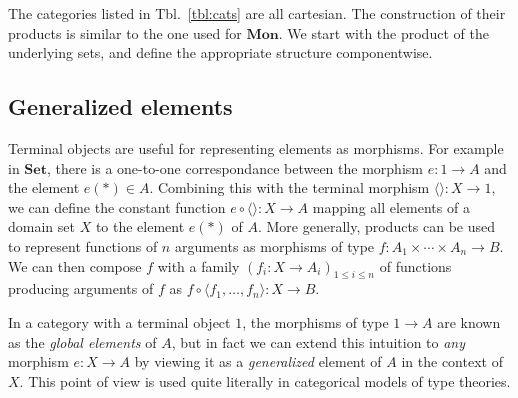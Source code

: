 \documentclass[draft,11pt]{report}
\theoremstyle{definition}
\begin{document}
The categories listed in Tbl.~\ref{tbl:cats} are all cartesian.
The construction of their products is similar to
the one used for $\mathbf{Mon}$.
We start with the product of the underlying sets,
and define the appropriate structure componentwise.


\subsection{Generalized elements} %

Terminal objects are useful for representing elements as morphisms.
For example in $\mathbf{Set}$,
there is a one-to-one correspondance between the morphism
$e : 1 \rightarrow A$ and the element $e(*) \in A$.
Combining this with the terminal morphism $\langle \rangle : X \rightarrow 1$,
we can define the constant function
$e \circ \langle \rangle : X \rightarrow A$
mapping all elements of a domain set $X$
to the element $e(*)$ of $A$.
More generally,
products can be used to represent functions
of $n$ arguments as morphisms of type
$f : A_1 \times \cdots \times A_n \rightarrow B$.
We can then compose $f$ with a family
$(f_i : X \rightarrow A_i)_{1 \le i \le n}$
of functions producing arguments of $f$
as $f \circ \langle f_1, \ldots, f_n \rangle : X \rightarrow B$.

In a category with a terminal object $1$,
the morphisms of type $1 \rightarrow A$ are known as
the \emph{global elements} of $A$,
but in fact we can extend this intuition to \emph{any}
morphism $e : X \rightarrow A$
by viewing it as a \emph{generalized} element of $A$
in the context of $X$.
This point of view is used quite literally
in categorical models of type theories.
\end{document}
